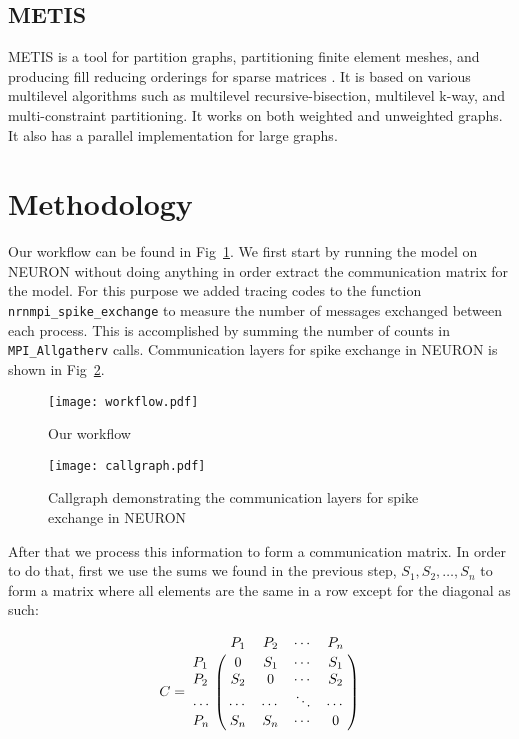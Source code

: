 \documentclass{article}
\begin{document}
\subsection{METIS}

METIS is a tool for partition graphs, partitioning finite element meshes, and producing fill reducing orderings for sparse matrices \cite{karypis_fast_1998}.
It is based on various multilevel algorithms such as multilevel recursive-bisection, multilevel k-way, and multi-constraint partitioning.
It works on both weighted and unweighted graphs.
It also has a parallel implementation for large graphs.

\section{Methodology}
\label{sec:methodology}

Our workflow can be found in Fig~\ref{fig:workflow}.
We first start by running the model on NEURON without doing anything in order extract the communication matrix for the model.
For this purpose we added tracing codes to the function \texttt{nrnmpi\_spike\_exchange} to measure the number of messages exchanged between each process.
This is accomplished by summing the number of counts in \texttt{MPI\_Allgatherv} calls.
Communication layers for spike exchange in NEURON is shown in Fig~\ref{fig:callgraph}.

\begin{figure}
  \centering
  \texttt{[image: workflow.pdf]}
  \caption{Our workflow}
  \label{fig:workflow}
\end{figure}

\begin{figure}
  \centering
  \texttt{[image: callgraph.pdf]}
  \caption{Callgraph demonstrating the communication layers for spike exchange in NEURON}
  \label{fig:callgraph}
\end{figure}

After that we process this information to form a communication matrix.
In order to do that, first we use the sums we found in the previous step, $S_1, S_2, \ldots, S_n$ to form a matrix where all elements are the same in a row except for the diagonal as such:

\begin{equation*}
C = \bordermatrix{~      & P_1    & P_2    & \cdots & P_n    \cr
                  P_1    & 0      & S_1    & \cdots & S_1    \cr
                  P_2    & S_2    & 0      & \cdots & S_2    \cr
                  \cdots & \cdots & \cdots & \ddots & \cdots \cr
                  P_n    & S_n    & S_n    & \cdots & 0      \cr
}
\end{equation*}
\end{document}
